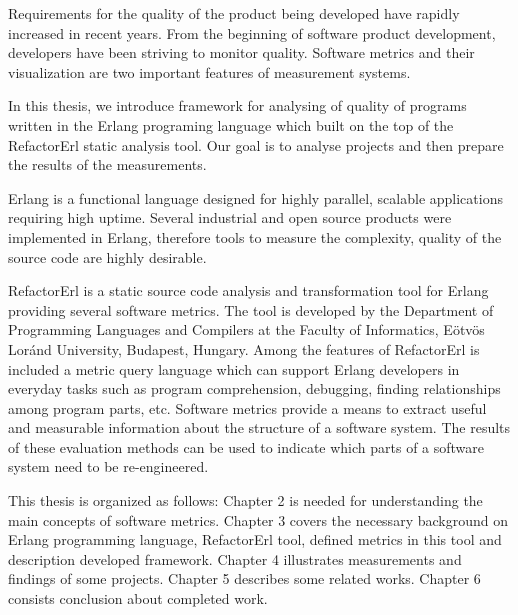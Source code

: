 Requirements for the quality of the product being developed have rapidly increased in recent years. From the beginning of software product development, developers have been striving to monitor quality. Software metrics and their visualization are two important features of measurement systems. 

In this thesis, we introduce framework for analysing of quality of programs written in the Erlang programing language which built on the top of the RefactorErl static analysis tool. Our goal is to analyse
projects and then prepare the results of the measurements.

Erlang is a functional language designed for highly parallel, scalable applications requiring high uptime. Several industrial and open source products were implemented in Erlang, therefore tools to measure the complexity, quality of the source code are highly desirable. 

RefactorErl is a static source code analysis and transformation tool for Erlang providing several software metrics. The tool is developed by the Department of Programming Languages and Compilers at the Faculty of Informatics, Eötvös Loránd University, Budapest, Hungary. 
Among the features of RefactorErl is included a metric query language which can support Erlang developers in everyday tasks such as program comprehension, debugging, finding relationships among program parts, etc.
Software metrics provide a means to extract useful and measurable information about the structure of a software system. The results of these evaluation methods can be used to indicate which parts of a software system need to be re-engineered.

This thesis is organized as follows: Chapter 2 is needed for understanding the main concepts of software metrics. Chapter 3 covers the necessary background on Erlang programming language, RefactorErl tool, defined metrics  in this tool and description developed framework. Chapter 4 illustrates measurements and findings of some projects. Chapter 5 describes some related works. Chapter 6 consists conclusion about completed work.

